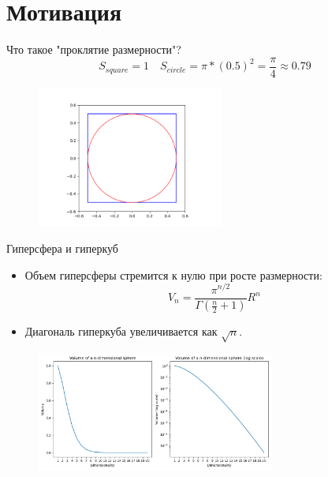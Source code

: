 \section{Мотивация}

\begin{frame}{Что такое "проклятие размерности"?}
    $$
        S_{square}=1 \quad S_{circle}=\pi*(0.5)^2=\frac{\pi}{4}\approx0.79
    $$
    \begin{figure}
        \includegraphics[width=0.55\textwidth]{../resources/motivation/inscribed_circle.png}
    \end{figure}
\end{frame}

\begin{frame}{Гиперсфера и гиперкуб}
    \begin{itemize}
        \item Объем гиперсферы стремится к нулю при росте размерности:
              \begin{equation*}
                  V_n = \frac{\pi^{n/2}}{\Gamma(\frac{n}{2}+1)}R^n
              \end{equation*}
        \item Диагональ гиперкуба увеличивается как \(\sqrt{n}\).
    \end{itemize}
    \begin{figure}
        \centering
        \includegraphics[width=0.7\textwidth]{../resources/motivation/sphere_volume.png}
    \end{figure}
\end{frame}

